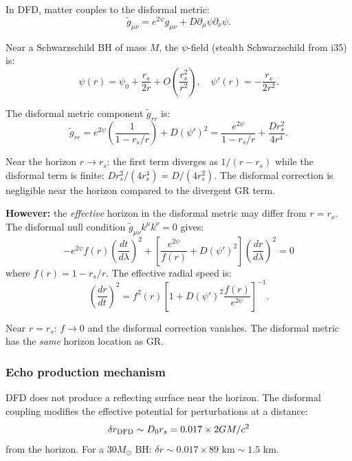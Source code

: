 \documentclass[11pt,a4paper]{article}
\begin{document}
In DFD, matter couples to the disformal metric:
\begin{equation}
\tilde{g}_{\mu\nu} = e^{2\psi}g_{\mu\nu} + D\partial_\mu\psi\partial_\nu\psi.
\end{equation}

Near a Schwarzschild BH of mass $M$, the $\psi$-field (stealth Schwarzschild from i35) is:
\begin{equation}
\psi(r) = \psi_0 + \frac{r_s}{2r} + O\left(\frac{r_s^2}{r^2}\right), \quad \psi'(r) = -\frac{r_s}{2r^2}.
\end{equation}

The disformal metric component $\tilde{g}_{rr}$ is:
\begin{equation}
\tilde{g}_{rr} = e^{2\psi}\left(\frac{1}{1-r_s/r}\right) + D(\psi')^2 = \frac{e^{2\psi}}{1-r_s/r} + \frac{D r_s^2}{4r^4}.
\end{equation}

Near the horizon $r \to r_s$: the first term diverges as $1/(r-r_s)$ while the disformal term is finite: $Dr_s^2/(4r_s^4) = D/(4r_s^2)$. The disformal correction is negligible near the horizon compared to the divergent GR term.

\textbf{However:} the \emph{effective} horizon in the disformal metric may differ from $r = r_s$. The disformal null condition $\tilde{g}_{\mu\nu}k^\mu k^\nu = 0$ gives:
\begin{equation}
-e^{2\psi}f(r)\left(\frac{dt}{d\lambda}\right)^2 + \left[\frac{e^{2\psi}}{f(r)} + D(\psi')^2\right]\left(\frac{dr}{d\lambda}\right)^2 = 0
\end{equation}
where $f(r) = 1 - r_s/r$. The effective radial speed is:
\begin{equation}
\left(\frac{dr}{dt}\right)^2 = f^2(r)\left[1 + D(\psi')^2\frac{f(r)}{e^{2\psi}}\right]^{-1}.
\end{equation}

Near $r = r_s$: $f \to 0$ and the disformal correction vanishes. The disformal metric has the \emph{same} horizon location as GR.

\subsubsection{Echo production mechanism}

DFD does not produce a reflecting surface near the horizon. The disformal coupling modifies the effective potential for perturbations at a distance:
\begin{equation}
\delta r_{\rm DFD} \sim D_0 r_s = 0.017 \times 2GM/c^2
\end{equation}
from the horizon. For a $30 M_\odot$ BH: $\delta r \sim 0.017 \times 89\text{ km} \sim 1.5$ km.
\end{document}
